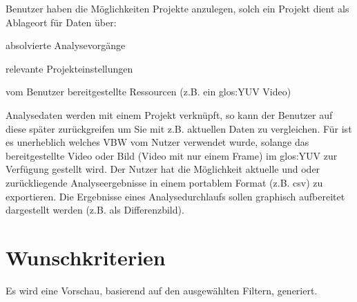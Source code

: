  Benutzer haben die Möglichkeiten Projekte anzulegen, solch ein Projekt dient als Ablageort für Daten über:
\begin{compactitem}
\item absolvierte Analysevorgänge
\item relevante Projekteinstellungen
\item vom Benutzer bereitgestellte Ressourcen (z.B. ein \gls{glos:YUV} Video)
\end{compactitem}
 	Analysedaten werden mit einem Projekt verknüpft, so kann der Benutzer auf diese später zurückgreifen um Sie mit z.B. aktuellen Daten zu vergleichen.
 Für \projektTitel ist es unerheblich welches \gls{VBW} vom Nutzer verwendet wurde, solange das bereitgestellte Video oder Bild (Video mit nur einem Frame) im \gls{glos:YUV} zur Verfügung gestellt wird.
 Der Nutzer hat die Möglichkeit aktuelle und oder zurückliegende Analyseergebnisse in einem portablem Format (z.B. \gls{csv}) zu exportieren.
 Die Ergebnisse eines Analysedurchlaufs sollen graphisch aufbereitet dargestellt werden (z.B. als Differenzbild).

\section{Wunschkriterien}
\setcounter{counterKriterien}{0}
 Es wird eine Vorschau, basierend auf den ausgewählten Filtern, generiert.

